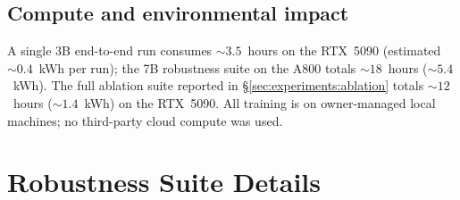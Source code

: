 \subsection{Compute and environmental impact}

A single 3B end-to-end run consumes $\sim 3.5$~hours on the RTX~5090
(estimated $\sim 0.4$~kWh per run); the 7B robustness suite on the
A800 totals $\sim 18$~hours ($\sim 5.4$~kWh). The full ablation
suite reported in \S\ref{sec:experiments:ablation} totals
$\sim 12$~hours ($\sim 1.4$~kWh) on the RTX~5090. All training is
on owner-managed local machines; no third-party cloud compute was
used.

\section{Robustness Suite Details}
\label{app:robustness-detail}

